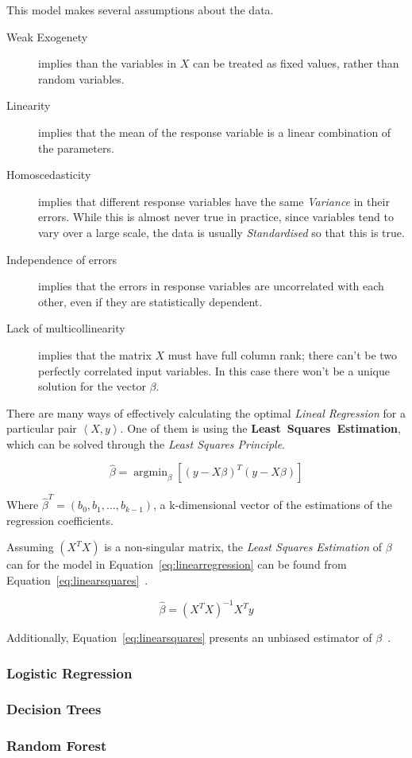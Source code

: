 This model makes several assumptions about the data.

\begin{description}
	\item[Weak Exogenety] implies than the variables in $X$ can be treated as fixed values, rather than random variables.
	\item[Linearity] implies that the mean of the response variable is a linear combination of the parameters.
	\item[Homoscedasticity] implies that different response variables have the same \emph{Variance} in their errors. While this is almost never true in practice, since variables tend to vary over a large scale, the data is usually \emph{Standardised} so that this is true.
	\item[Independence of errors] implies that the errors in response variables are uncorrelated with each other, even if they are statistically dependent.
	\item[Lack of multicollinearity] implies that the matrix $X$ must have full column rank; there can't be two perfectly correlated input variables. In this case there won't be a unique solution for the vector $\beta$.
\end{description}

There are many ways of effectively calculating the optimal \emph{Lineal Regression} for a particular pair $\left< X, y \right>$. One of them is using the \textbf{Least~Squares~Estimation}, which can be solved through the \emph{Least Squares Principle}.

\begin{equation}
\label{eq:leastsquaresprinciple}
	\hat{\beta} = \operatorname{argmin}_\beta \left[ {\left( y - X \beta \right)}^T \left( y - X \beta \right)\right]
\end{equation}

Where $\hat{\beta}^T = \left( b_0, b_1, \dots, b_{k - 1} \right)$, a k-dimensional vector of the estimations of the regression coefficients.

Assuming $\left( X^T X \right)$ is a non-singular matrix, the \emph{Least Squares Estimation} of $\beta$ can for the model in Equation~\ref{eq:linearregression} can be found from Equation~\ref{eq:linearsquares}~\cite{yan2009linear}.

\begin{equation}
\label{eq:linearsquares}
	\hat{\beta} = {\left( X^T X \right)}^{-1} X^T y
\end{equation}

Additionally, Equation~\ref{eq:linearsquares} presents an unbiased estimator of $\beta$~\cite{yan2009linear}.

\subsubsection{Logistic Regression}
\label{subsec:logisticregression}

\subsubsection{Decision Trees}
\label{subsec:decisiontrees}

\subsubsection{Random Forest}
\label{subsec:randomforest}

